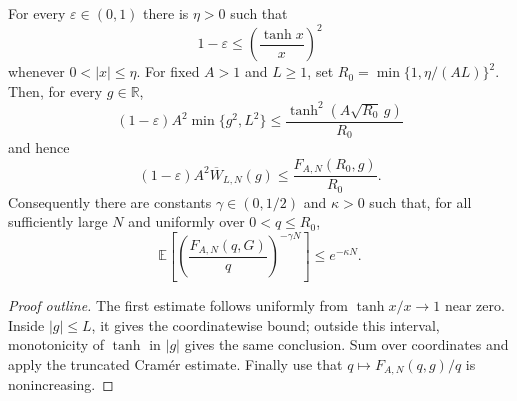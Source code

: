 \begin{lemma}
  \label{lem:gaussian-uniform-small-tanh-ratio}
  \leanok
  For every $\varepsilon\in(0,1)$ there is $\eta>0$ such that
  \[
    1-\varepsilon
    \leq \left(\frac{\tanh x}{x}\right)^2
  \]
  whenever $0<|x|\leq\eta$. For fixed $A>1$ and $L\ge1$, set
  $R_0=\min\{1,\eta/(AL)\}^2$. Then, for every $g\in\mathbb R$,
  \[
    (1-\varepsilon)A^2\min\{g^2,L^2\}
    \leq \frac{\tanh^2(A\sqrt{R_0}\,g)}{R_0}
  \]
  and hence
  \[
    (1-\varepsilon)A^2\overline W_{L,N}(g)
    \leq \frac{F_{A,N}(R_0,g)}{R_0}.
  \]
  Consequently there are constants
  $\gamma\in(0,1/2)$ and $\kappa>0$ such that, for all sufficiently large
  $N$ and uniformly over $0<q\leq R_0$,
  \[
    \mathbb E\left[
      \left(\frac{F_{A,N}(q,G)}q\right)^{-\gamma N}
    \right]\leq e^{-\kappa N}.
  \]
\end{lemma}
\begin{proof}[Proof outline]
  \leanok
  The first estimate follows uniformly from $\tanh x/x\to1$ near zero. Inside
  $|g|\leq L$, it gives the coordinatewise bound;
  outside this interval, monotonicity of $\tanh$ in $|g|$ gives the same
  conclusion. Sum over coordinates and apply the truncated Cramér estimate.
  Finally use that
  $q\mapsto F_{A,N}(q,g)/q$ is nonincreasing.
\end{proof}

